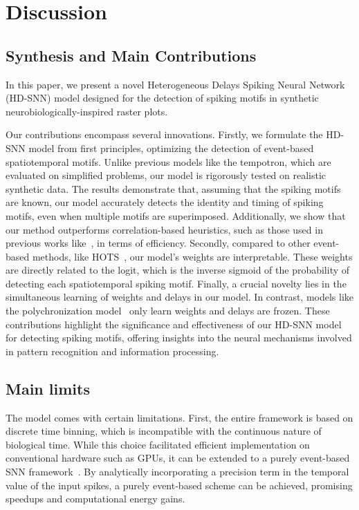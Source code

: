 \documentclass[runningheads]{llncs}
\begin{document}
\section{Discussion}
%
\subsection{Synthesis and Main Contributions}
In this paper, we present a novel Heterogeneous Delays Spiking Neural Network (HD-SNN) model designed for the detection of spiking motifs in synthetic neurobiologically-inspired raster plots.

Our contributions encompass several innovations. Firstly, we formulate the HD-SNN model from first principles, optimizing the detection of event-based spatiotemporal motifs. Unlike previous models like the tempotron, which are evaluated on simplified problems, our model is rigorously tested on realistic synthetic data. The results demonstrate that, assuming that the spiking motifs are known, our model accurately detects the identity and timing of spiking motifs, even when multiple motifs are superimposed. Additionally, we show that our method outperforms correlation-based heuristics, such as those used in previous works like~\cite{ghosh_spatiotemporal_2019,yu_stsc-snn_2022}, in terms of efficiency. Secondly, compared to other event-based methods, like HOTS~\cite{lagorce_hots_2017}, our model's weights are interpretable. These weights are directly related to the logit, which is the inverse sigmoid of the probability of detecting each spatiotemporal spiking motif. Finally, a crucial novelty lies in the simultaneous learning of weights and delays in our model. In contrast, models like the polychronization model~\cite{izhikevich_polychronization_2006} only learn weights and delays are frozen. These contributions highlight the significance and effectiveness of our HD-SNN model for detecting spiking motifs, offering insights into the neural mechanisms involved in pattern recognition and information processing.

\subsection{Main limits}

The model comes with certain limitations. First, the entire framework is based on discrete time binning, which is incompatible with the continuous nature of biological time. While this choice facilitated efficient implementation on conventional hardware such as GPUs, it can be extended to a purely event-based SNN framework~\cite{grimaldi_robust_2023}. By analytically incorporating a precision term in the temporal value of the input spikes, a purely event-based scheme can be achieved, promising speedups and computational energy gains.
\end{document}

